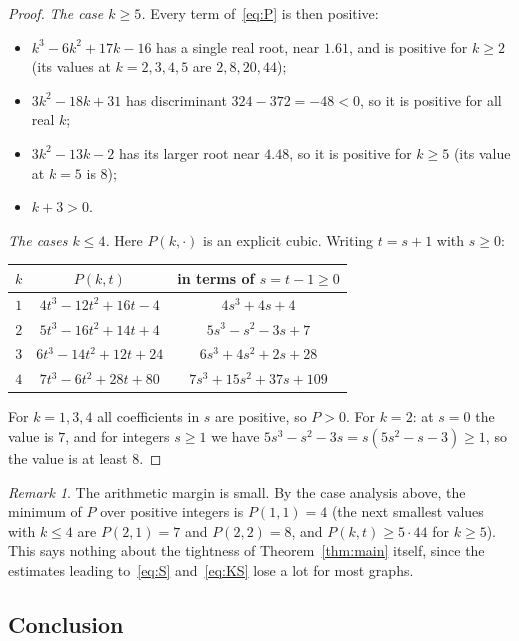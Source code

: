 \documentclass[11pt]{article}
\theoremstyle{definition}
\theoremstyle{remark}
\newtheorem{remark}[theorem]{Remark}
\begin{document}
\begin{proof}
\emph{The case $k \ge 5$.} Every term of~\eqref{eq:P} is then positive:
\begin{itemize}
\item $k^3 - 6k^2 + 17k - 16$ has a single real root, near $1.61$, and is
  positive for $k \ge 2$ (its values at $k = 2,3,4,5$ are $2, 8, 20, 44$);
\item $3k^2 - 18k + 31$ has discriminant $324 - 372 = -48 < 0$, so it is
  positive for all real $k$;
\item $3k^2 - 13k - 2$ has its larger root near $4.48$, so it is positive for
  $k \ge 5$ (its value at $k=5$ is $8$);
\item $k + 3 > 0$.
\end{itemize}

\emph{The cases $k \le 4$.} Here $P(k,\cdot)$ is an explicit cubic. Writing
$t = s + 1$ with $s \ge 0$:
\begin{center}
\begin{tabular}{ccc}
\toprule
$k$ & $P(k,t)$ & in terms of $s = t-1 \ge 0$ \\
\midrule
$1$ & $4t^3 - 12t^2 + 16t - 4$ & $4s^3 + 4s + 4$ \\
$2$ & $5t^3 - 16t^2 + 14t + 4$ & $5s^3 - s^2 - 3s + 7$ \\
$3$ & $6t^3 - 14t^2 + 12t + 24$ & $6s^3 + 4s^2 + 2s + 28$ \\
$4$ & $7t^3 - 6t^2 + 28t + 80$ & $7s^3 + 15s^2 + 37s + 109$ \\
\bottomrule
\end{tabular}
\end{center}
For $k = 1, 3, 4$ all coefficients in $s$ are positive, so $P > 0$. For
$k = 2$: at $s = 0$ the value is $7$, and for integers $s \ge 1$ we have
$5s^3 - s^2 - 3s = s(5s^2 - s - 3) \ge 1$, so the value is at least $8$.
\end{proof}

\begin{remark}
The arithmetic margin is small. By the case analysis above, the minimum of
$P$ over positive integers is $P(1,1) = 4$ (the next smallest values with
$k \le 4$ are $P(2,1) = 7$ and $P(2,2) = 8$, and $P(k,t) \ge 5 \cdot 44$ for
$k \ge 5$). This says nothing about the tightness of Theorem~\ref{thm:main}
itself, since the estimates leading to~\eqref{eq:S} and~\eqref{eq:KS} lose
a lot for most graphs.
\end{remark}

\subsection{Conclusion}
\end{document}
